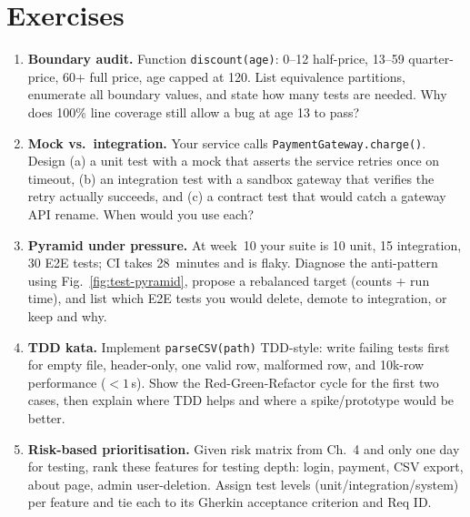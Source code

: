 \section{Exercises}
\label{sec:ch06-exercises}
\begin{enumerate}[label=E6.\arabic*, leftmargin=*, itemsep=0.6em]
    \item \textbf{Boundary audit.} Function \texttt{discount(age)}: 0--12 half-price, 13--59 quarter-price, 60+ full price, age capped at 120. List equivalence partitions, enumerate all boundary values, and state how many tests are needed. Why does 100\% line coverage still allow a bug at age 13 to pass?
    \item \textbf{Mock vs.\ integration.} Your service calls \texttt{PaymentGateway.charge()}. Design (a) a unit test with a mock that asserts the service retries once on timeout, (b) an integration test with a sandbox gateway that verifies the retry actually succeeds, and (c) a contract test that would catch a gateway API rename. When would you use each?
    \item \textbf{Pyramid under pressure.} At week~10 your suite is 10 unit, 15 integration, 30 E2E tests; CI takes 28~minutes and is flaky. Diagnose the anti-pattern using Fig.~\ref{fig:test-pyramid}, propose a rebalanced target (counts + run time), and list which E2E tests you would delete, demote to integration, or keep and why.
    \item \textbf{TDD kata.} Implement \texttt{parseCSV(path)} TDD-style: write failing tests first for empty file, header-only, one valid row, malformed row, and 10k-row performance ($<1$\,s). Show the Red-Green-Refactor cycle for the first two cases, then explain where TDD helps and where a spike/prototype would be better.
    \item \textbf{Risk-based prioritisation.} Given risk matrix from Ch.~4 and only one day for testing, rank these features for testing depth: login, payment, CSV export, about page, admin user-deletion. Assign test levels (unit/integration/system) per feature and tie each to its Gherkin acceptance criterion and Req ID.
\end{enumerate}
